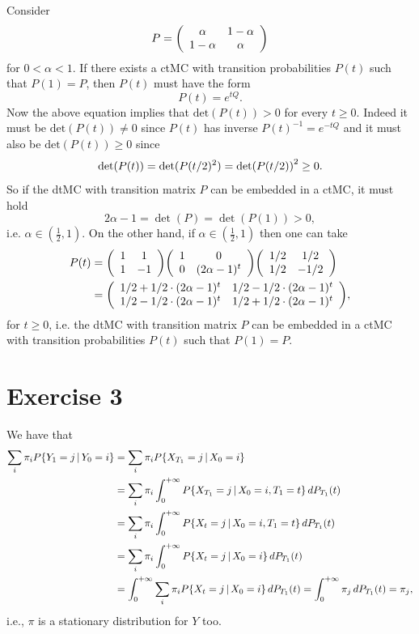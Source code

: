 \documentclass[a4paper,11pt]{article}
\theoremstyle{definition}
\theoremstyle{plain}
\theoremstyle{remark}
\DeclarePairedDelimiter{\parr}{(}{)}
\DeclarePairedDelimiter{\bra}{\lbrace}{\rbrace}
\begin{document}
Consider
$$
P = \parr*{\begin{array}{cc} \alpha & 1-\alpha \\ 1-\alpha & \alpha
\end{array}}
$$
for $0<\alpha<1$. If there exists a ctMC with transition probabilities $P(t)$ such that $P(1)=P$, then $P(t)$ must have the form
$$
P(t) = e^{tQ}.
$$ 
Now the above equation implies that $\mathrm{det}(P(t))>0$ for every $t\geq0$. Indeed it must be $\mathrm{det}(P(t))\neq0$ since $P(t)$ has inverse $P(t)^{-1}=e^{-tQ}$ and it must also be $\mathrm{det}(P(t))\geq0$ since 
$$
\mathrm{det}(P(t))= \mathrm{det}\parr{P\parr{t/2}^2} = \mathrm{det}\parr*{P\parr*{t/2}}^2\geq0.
$$
So if the dtMC with transition matrix $P$ can be embedded in a ctMC, it must hold
$$
2\alpha -1 = \det(P) = \det(P(1)) > 0,
$$
i.e. $\alpha\in(\frac{1}{2},1)$. On the other hand, if $\alpha\in(\frac{1}{2},1)$ then one can take 
\begin{align*}
P(t) & = \parr*{\begin{array}{cc}
1 & 1 \\ 1 & -1
\end{array}}\parr*{\begin{array}{cc}
1 & 0 \\ 0 & (2\alpha-1)^t
\end{array}}\parr*{\begin{array}{cc}
1/2 & 1/2 \\ 1/2 & -1/2
\end{array}} \\ & = \parr*{\begin{array}{cc}
1/2 + 1/2\cdot(2\alpha-1)^t & 1/2 - 1/2\cdot(2\alpha-1)^t \\ 
1/2-1/2\cdot(2\alpha-1)^t & 1/2 + 1/2\cdot(2\alpha-1)^t
\end{array}},
\end{align*}
for $t\geq 0 $, i.e. the dtMC with transition matrix $P$ can be embedded in a ctMC with transition probabilities $P(t)$ such that $P(1)=P$.

\section*{Exercise 3}

We have that
\begin{align*}
\sum_i\pi_iP\bra{Y_1=j\,|\,Y_0=i} & = \sum_i\pi_iP\bra{X_{T_1}=j\,|\,X_0=i} \\ & = \sum_i\pi_i\int_0^{+\infty}P\bra{X_{T_1}=j\,|\,X_0=i, T_1=t}\,dP_{T_1}(t) \\ & = \sum_i\pi_i\int_0^{+\infty}P\bra{X_t=j\,|\,X_0=i, T_1=t}\,dP_{T_1}(t) \\ & = \sum_i\pi_i\int_0^{+\infty}P\bra{X_t=j\,|\,X_0=i}\,dP_{T_1}(t) \\ & = \int_0^{+\infty}\sum_i\pi_iP\bra{X_t=j\,|\,X_0=i}\,dP_{T_1}(t) = \int_0^{+\infty}\pi_j\,dP_{T_1}(t) = \pi_j,
\end{align*}
i.e., $\pi$ is a stationary distribution for $Y$ too.
\end{document}
